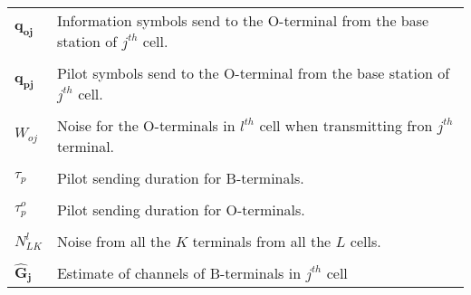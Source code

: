 \documentclass[10pt, a4paper, twoside,fleqn]{article}
\begin{document}
\begin{appendices}
\begin{flushleft}
\begin{tabular}{ll}
	$\pmb{q_{oj}}$                 & Information symbols send to the O-terminal from the base station of $j^{th}$ cell.\\ \\
	$\pmb{q_{pj}}$                 & Pilot symbols send to the O-terminal from the base station of $j^{th}$ cell.\\ \\
	$W_{oj}$                          & Noise for the O-terminals in $l^{th}$ cell when transmitting fron $j^{th}$ terminal. \\ \\
        $\tau_{p}$                        & Pilot sending duration for B-terminals.\\ \\
        $\tau_{p}^{o}$                    & Pilot sending duration for O-terminals.\\ \\
        $N_{LK}^{l}$                      & Noise from all the $K$ terminals from all the $L$ cells.\\ \\
	$\pmb{\hat G_j}$               & Estimate of channels of B-terminals in $j^{th}$ cell
\end{tabular}
\end{flushleft}
\end{appendices}

{}

\enddocument
\end{document}
